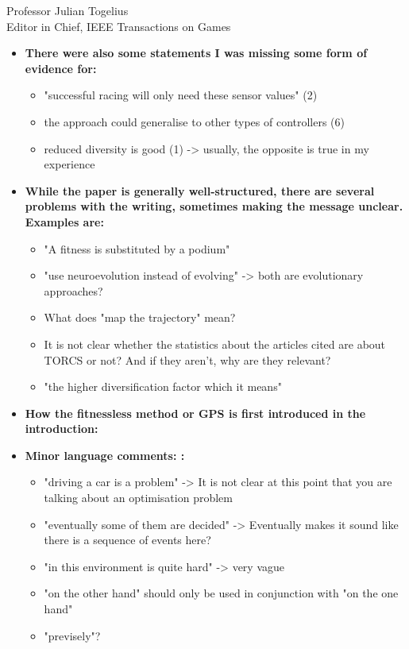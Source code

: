 \documentclass[10pt]{letter} %
\begin{document}
\begin{letter}{Professor Julian Togelius \\ Editor in Chief, IEEE Transactions on Games}
\begin{enumerate}
\begin{itemize}
	
		\item {\bf There were also some statements I was missing some form of evidence for:}
			\begin{itemize}
	\item	"successful racing will only need these sensor values" (2)
	\item	the approach could generalise to other types of controllers (6)
	\item	reduced diversity is good (1) -> usually, the opposite is true in my experience
	\end{itemize}

	\item {\bf 	While the paper is generally well-structured, there are several problems with the writing, sometimes making the message unclear. Examples are:}
		\begin{itemize}
		\item "A fitness is substituted by a podium"
		\item "use neuroevolution instead of evolving" -> both are evolutionary approaches?
		\item What does "map the trajectory" mean?
		\item It is not clear whether the statistics about the articles cited are about TORCS or not? And if they aren't, why are they relevant?
		\item "the higher diversification factor which it means"
\end{itemize}
	
	
	\item {\bf How the fitnessless method or GPS is first introduced in the introduction:}
	\item {\bf Minor language comments: :} 
				\begin{itemize}
			\item 	"driving a car is a problem" -> It is not clear at this point that you are talking about an optimisation problem
			\item 	"eventually some of them are decided" -> Eventually makes it sound like there is a sequence of events here?
	

			\item 	"in this environment is quite hard" -> very vague

			\item 	"on the other hand" should only be used in conjunction with "on the one hand"
			\item 	"previsely"?
			
					
					

\end{itemize}
\end{itemize}
\end{enumerate}
\end{letter}
\end{document}
